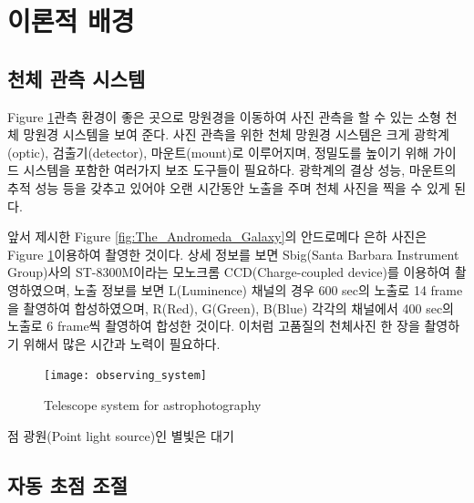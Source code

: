 \section{이론적 배경}

\subsection{천체 관측 시스템}

Figure \ref{fig:observing_system}\은 관측 환경이 좋은 곳으로 망원경을 이동하여 사진 관측을 할 수 있는 소형 천체 망원경 시스템을 보여 준다. 사진 관측을 위한 천체 망원경 시스템은 크게 광학계(optic), 검출기(detector), 마운트(mount)로 이루어지며, 정밀도를 높이기 위해 가이드 시스템을 포함한 여러가지 보조 도구들이 필요하다. 광학계의 결상 성능, 마운트의 추적 성능 등을 갖추고 있어야 오랜 시간동안 노출을 주며 천체 사진을 찍을 수 있게 된다. 

앞서 제시한 Figure \ref{fig:The_Andromeda_Galaxy}의 안드로메다 은하 사진은 Figure \ref{fig:observing_system}\을 이용하여 촬영한 것이다. 상세 정보를 보면 Sbig(Santa Barbara Instrument Group)사의  ST-8300M이라는 모노크롬 CCD(Charge-coupled device)를 이용하여 촬영하였으며, 노출 정보를 보면 L(Luminence) 채널의 경우 600 sec의 노출로 14 frame을 촬영하여 합성하였으며, R(Red), G(Green), B(Blue) 각각의 채널에서 400 sec의 노출로 6 frame씩 촬영하여 합성한 것이다. 이처럼 고품질의 천체사진 한 장을 촬영하기 위해서 많은 시간과 노력이 필요하다. 

\begin{figure}[h]
	\begin{center}
		\texttt{[image: observing\_system]}
		\caption{Telescope system for astrophotography}
		\label{fig:observing_system}
	\end{center}
\end{figure}

점 광원(Point light source)인 별빛은 대기

\subsection{자동 초점 조절}



